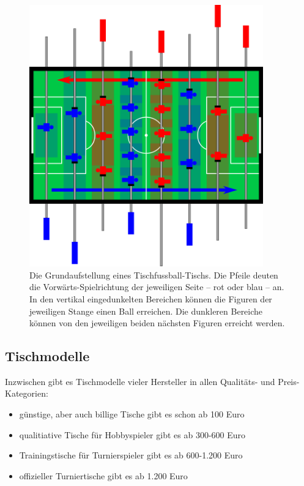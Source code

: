 \begin{figure}
    \centering 
    \includegraphics[width=0.9\textwidth]{img/grundlagen_bereiche2.png}
    \caption{Die Grundaufstellung eines Tischfussball-Tischs. Die Pfeile deuten die Vorwärts-Spielrichtung der jeweiligen Seite -- rot oder blau -- an. In den vertikal eingedunkelten Bereichen können die Figuren der jeweiligen Stange einen Ball erreichen. Die dunkleren Bereiche können von den jeweiligen beiden nächsten Figuren erreicht werden.} 
    \label{fig:tisch:tischbereiche} 
\end{figure}

\subsection{Tischmodelle}
\label{tisch:tisch:modelle}

Inzwischen gibt es Tischmodelle vieler Hersteller in allen Qualitäts- und Preis-Kategorien:
\begin{itemize}
    \item günstige, aber auch billige Tische gibt es schon ab 100 Euro 
    \item qualitiative Tische für Hobbyspieler gibt es ab 300-600 Euro
    \item Trainingstische für Turnierspieler gibt es ab 600-1.200 Euro
    \item offizieller Turniertische gibt es ab 1.200 Euro 
\end{itemize}

